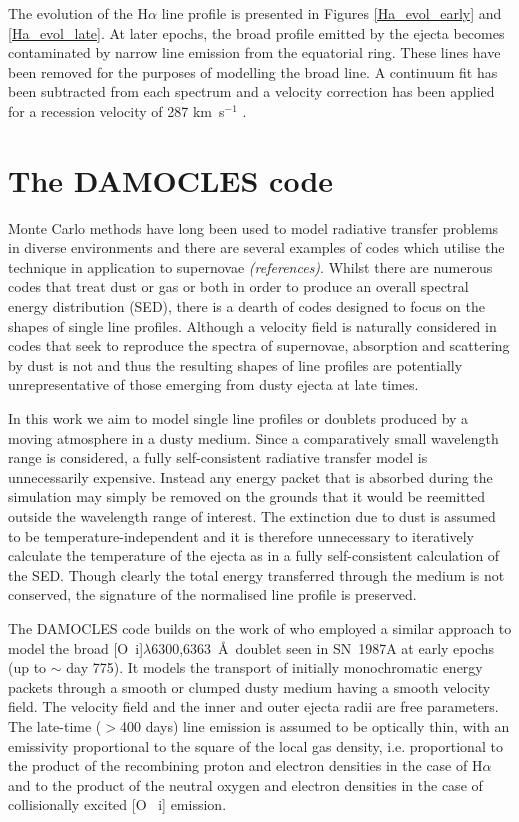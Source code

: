 \documentclass[useAMS,usenatbib,usegraphicx]{mnras}
\begin{document}
The evolution of the H$\alpha$ line profile is presented in Figures 
\ref{Ha_evol_early} and \ref{Ha_evol_late}.  At later epochs, the broad 
profile emitted by the ejecta becomes contaminated by narrow line emission 
from the equatorial ring.  These lines have been removed for the purposes 
of modelling the broad line. A continuum fit has been subtracted from each 
spectrum and a velocity correction has been applied for a recession 
velocity of 287 km~s$^{-1}$ \citep{Groningsson2008}.



\section{The DAMOCLES code}
\label{code}

Monte Carlo methods have long been used to model radiative transfer 
problems in diverse environments and there are several examples of codes 
which utilise the technique in application to supernovae 
\textit{(references)}.  Whilst there are numerous codes that 
treat dust or gas or both in order to produce an overall spectral energy 
distribution (SED), there is a dearth of codes designed to focus on the 
shapes of single line profiles.  Although a velocity field is naturally 
considered in codes that seek to reproduce the spectra of supernovae, 
absorption and scattering by dust is not and thus the resulting shapes of 
line profiles are potentially unrepresentative of those emerging from 
dusty ejecta at late times.

In this work we aim to model single line profiles or doublets produced by 
a moving atmosphere in a dusty medium.  
Since a comparatively small wavelength range is considered, a fully 
self-consistent radiative transfer model is unnecessarily expensive.  
Instead any energy packet that is absorbed during the simulation may 
simply be removed on the grounds that it would be 
reemitted outside the wavelength range of interest. The extinction due to 
dust is assumed to be temperature-independent and it is therefore 
unnecessary to iteratively calculate the temperature of the ejecta as in a 
fully self-consistent calculation of the SED.  Though clearly the total 
energy transferred through the medium is not conserved, the signature of 
the normalised line profile is preserved.

The DAMOCLES code builds on the work of \citet{Lucy1989} who employed a 
similar approach to model the broad [O~{\sc i}]$\lambda$6300,6363~\AA\ doublet 
seen in SN~1987A at early epochs (up to $\sim$ day 775).  It models the 
transport of initially monochromatic energy packets through a smooth or 
clumped dusty medium having a smooth velocity field. The velocity field 
and the inner and outer ejecta radii are free parameters. The late-time 
($>$400 days) line emission is assumed to be optically thin, with an 
emissivity proportional to the square of the local gas density, i.e. 
proportional to the product of the recombining proton and electron 
densities in the case of H$\alpha$ and to the product of the neutral 
oxygen and electron densities in the case of collisionally excited [O~{\sc 
i}] emission.
\end{document}
